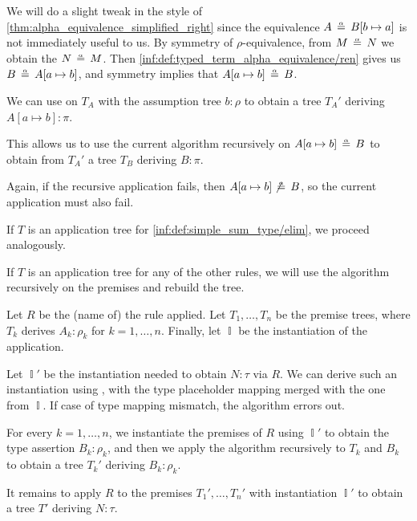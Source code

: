 \begin{algorithm}
\begin{thmenum}
\begin{thmenum}
      We will do a slight tweak in the style of \cref{thm:alpha_equivalence_simplified_right} since the equivalence \( A \aequiv B[b \mapsto a] \) is not immediately useful to us. By symmetry of \( \rho \)-equivalence, from \( M \aequiv N \) we obtain the \( N \aequiv M \). Then \ref{inf:def:typed_term_alpha_equivalence/ren} gives us \( B \aequiv A[a \mapsto b] \), and symmetry implies that \( A[a \mapsto b] \aequiv B \).

      We can use  on \( T_A \) with the assumption tree \( b: \rho \) to obtain a tree \( T_A' \) deriving \( A[a \mapsto b]: \pi \).

      This allows us to use the current algorithm recursively on \( A[a \mapsto b] \aequiv B \) to obtain from \( T_A' \) a tree \( T_B \) deriving \( B: \pi \).

      Again, if the recursive application fails, then \( A[a \mapsto b] \not\aequiv B \), so the current application must also fail.
    \end{thmenum}

     If \( T \) is an application tree for \ref{inf:def:simple_sum_type/elim}, we proceed analogously.

     If \( T \) is an application tree for any of the other rules, we will use the algorithm recursively on the premises and rebuild the tree.

    Let \( R \) be the (name of) the rule applied. Let \( T_1, \ldots, T_n \) be the premise trees, where \( T_k \) derives \( A_k: \rho_k \) for \( k = 1, \ldots, n \). Finally, let \( \BbbI \) be the instantiation of the application.

    Let \( \BbbI' \) be the instantiation needed to obtain \( N: \tau \) via \( R \). We can derive such an instantiation using , with the type placeholder mapping merged with the one from \( \BbbI \). If case of type mapping mismatch, the algorithm errors out.

    For every \( k = 1, \ldots, n \), we instantiate the premises of \( R \) using \( \BbbI' \) to obtain the type assertion \( B_k: \rho_k \), and then we apply the algorithm recursively to \( T_k \) and \( B_k \) to obtain a tree \( T_k' \) deriving \( B_k: \rho_k \).

    It remains to apply \( R \) to the premises \( T_1', \ldots, T_n' \) with instantiation \( \BbbI' \) to obtain a tree \( T' \) deriving \( N: \tau \).
  \end{thmenum}
\end{algorithm}
